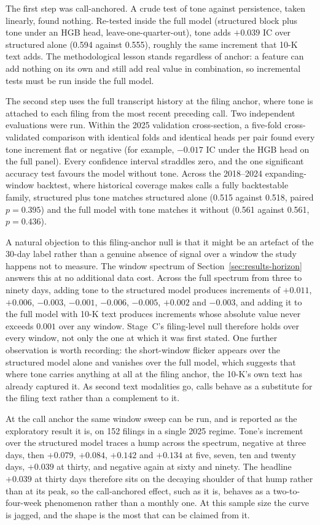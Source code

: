 \documentclass[logo,msc,ai]{infthesis}        %
\begin{document}
The first step was call-anchored. A crude test of tone against persistence, taken linearly, found nothing. Re-tested inside the full model (structured block plus tone under an HGB head, leave-one-quarter-out), tone adds $+0.039$ IC over structured alone (0.594 against 0.555), roughly the same increment that 10-K text adds. The methodological lesson stands regardless of anchor: a feature can add nothing on its own and still add real value in combination, so incremental tests must be run inside the full model.

The second step uses the full transcript history at the filing anchor, where tone is attached to each filing from the most recent preceding call. Two independent evaluations were run. Within the 2025 validation cross-section, a five-fold cross-validated comparison with identical folds and identical heads per pair found every tone increment flat or negative (for example, $-0.017$ IC under the HGB head on the full panel). Every confidence interval straddles zero, and the one significant accuracy test favours the model without tone. Across the 2018--2024 expanding-window backtest, where historical coverage makes calls a fully backtestable family, structured plus tone matches structured alone (0.515 against 0.518, paired $p=0.395$) and the full model with tone matches it without (0.561 against 0.561, $p=0.436$).

A natural objection to this filing-anchor null is that it might be an artefact of the 30-day label rather than a genuine absence of signal over a window the study happens not to measure. The window spectrum of Section~\ref{sec:results-horizon} answers this at no additional data cost. Across the full spectrum from three to ninety days, adding tone to the structured model produces increments of $+0.011$, $+0.006$, $-0.003$, $-0.001$, $-0.006$, $-0.005$, $+0.002$ and $-0.003$, and adding it to the full model with 10-K text produces increments whose absolute value never exceeds $0.001$ over any window. Stage~C's filing-level null therefore holds over every window, not only the one at which it was first stated. One further observation is worth recording: the short-window flicker appears over the structured model alone and vanishes over the full model, which suggests that where tone carries anything at all at the filing anchor, the 10-K's own text has already captured it. As second text modalities go, calls behave as a substitute for the filing text rather than a complement to it.

At the call anchor the same window sweep can be run, and is reported as the exploratory result it is, on 152 filings in a single 2025 regime. Tone's increment over the structured model traces a hump across the spectrum, negative at three days, then $+0.079$, $+0.084$, $+0.142$ and $+0.134$ at five, seven, ten and twenty days, $+0.039$ at thirty, and negative again at sixty and ninety. The headline $+0.039$ at thirty days therefore sits on the decaying shoulder of that hump rather than at its peak, so the call-anchored effect, such as it is, behaves as a two-to-four-week phenomenon rather than a monthly one. At this sample size the curve is jagged, and the shape is the most that can be claimed from it.
\end{document}
